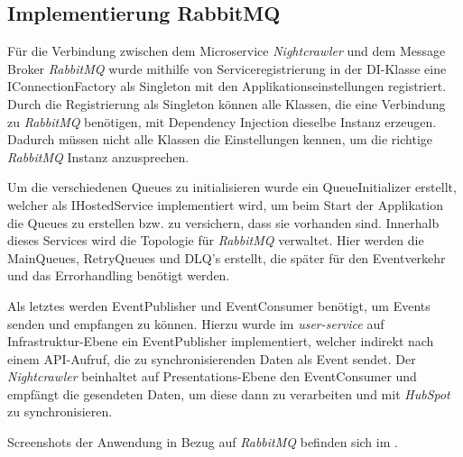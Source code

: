 \subsection{Implementierung RabbitMQ}
\label{sec:ImplementierungRabbitMQ}
Für die Verbindung zwischen dem Microservice \textit{Nightcrawler} und dem Message Broker \textit{RabbitMQ} wurde mithilfe von 
Serviceregistrierung in der \acs{DI}-Klasse eine IConnectionFactory als Singleton mit den Applikationseinstellungen registriert.
Durch die Registrierung als Singleton können alle Klassen, die eine Verbindung zu \textit{RabbitMQ} benötigen, mit Dependency Injection
dieselbe Instanz erzeugen. Dadurch müssen nicht alle Klassen die Einstellungen kennen, um die richtige \textit{RabbitMQ} Instanz anzusprechen.
\par\smallskip
Um die verschiedenen Queues zu initialisieren wurde ein QueueInitializer erstellt, welcher als IHostedService implementiert wird,
um beim Start der Applikation die Queues zu erstellen bzw. zu versichern, dass sie vorhanden sind. Innerhalb dieses Services wird die Topologie
für \textit{RabbitMQ} verwaltet. Hier werden die MainQueues, RetryQueues und \ac{DLQ}'s erstellt, die später für
den Eventverkehr und das Errorhandling benötigt werden.
\par\smallskip
Als letztes werden EventPublisher und EventConsumer benötigt, um Events senden und empfangen zu können.
Hierzu wurde im \textit{user-service} auf Infrastruktur-Ebene ein EventPublisher implementiert, welcher indirekt nach einem \acs{API}-Aufruf,
die zu synchronisierenden Daten als Event sendet. Der \textit{Nightcrawler} beinhaltet auf Presentations-Ebene den EventConsumer und empfängt die gesendeten Daten,
um diese dann zu verarbeiten und mit \textit{HubSpot} zu synchronisieren.
\par\smallskip
Screenshots der Anwendung in Bezug auf \textit{RabbitMQ} befinden sich im .



